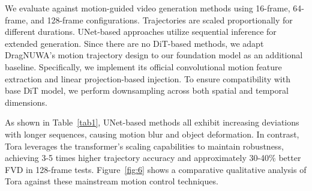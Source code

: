 
We evaluate against motion-guided video generation methods using 16-frame, 64-frame, and 128-frame configurations. Trajectories are scaled proportionally for different durations. UNet-based approaches utilize sequential inference for extended generation. Since there are no DiT-based methods, we adapt DragNUWA's motion trajectory design to our foundation model as an additional baseline. Specifically, we implement its official convolutional motion feature extraction and linear projection-based injection. To ensure compatibility with base DiT model, we perform downsampling across both spatial and temporal dimensions.

As shown in Table~\ref{tab1}, UNet-based methods all exhibit increasing deviations with longer sequences, causing motion blur and object deformation. In contrast, Tora leverages the transformer's scaling capabilities to maintain robustness, achieving 3-5 times higher trajectory accuracy and approximately 30-40$\%$ better FVD in 128-frame tests. Figure~\ref{fig:6} shows a comparative qualitative analysis of Tora against these mainstream motion control techniques.

